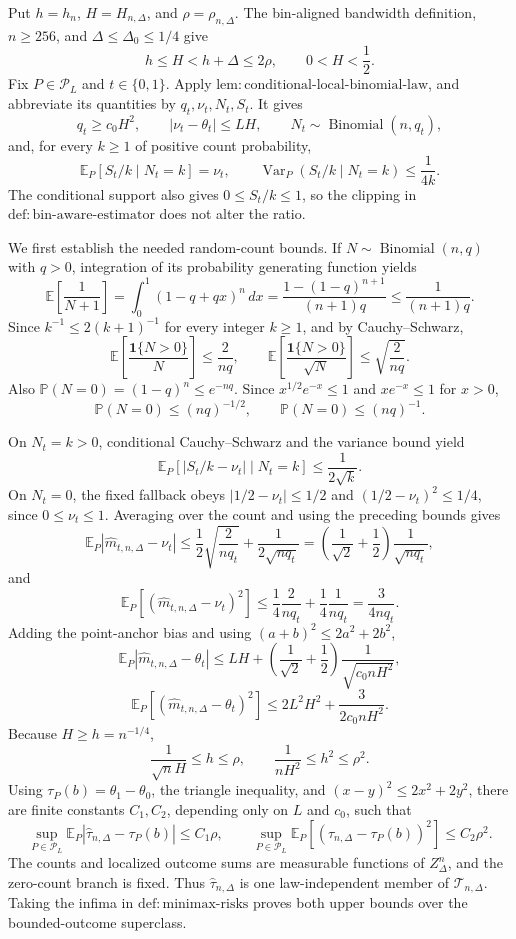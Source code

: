 Put \(h=h_n\), \(H=H_{n,\Delta}\), and \(\rho=\rho_{n,\Delta}\).  The bin-aligned bandwidth definition, \(n\geq256\), and \(\Delta\leq\Delta_0\leq1/4\) give
\[
 h\leq H<h+\Delta\leq2\rho,
 \qquad 0<H<\frac12.
\]
Fix \(P\in\mathcal P_L\) and \(t\in\{0,1\}\).  Apply \(\mathrm{lem:conditional\text{-}local\text{-}binomial\text{-}law}\), and abbreviate its quantities by \(q_t,\nu_t,N_t,S_t\).  It gives
\[
 q_t\geq c_0H^2,
 \qquad |\nu_t-\theta_t|\leq LH,
 \qquad N_t\sim\operatorname{Binomial}(n,q_t),
\]
and, for every \(k\geq1\) of positive count probability,
\[
 \mathbb E_P[S_t/k\mid N_t=k]=\nu_t,
 \qquad
 \operatorname{Var}_P(S_t/k\mid N_t=k)\leq\frac1{4k}.
\]
The conditional support also gives \(0\leq S_t/k\leq1\), so the clipping in \(\mathrm{def:bin\text{-}aware\text{-}estimator}\) does not alter the ratio.

We first establish the needed random-count bounds.  If \(N\sim\operatorname{Binomial}(n,q)\) with \(q>0\), integration of its probability generating function yields
\[
 \mathbb E\!\left[\frac1{N+1}\right]
 =\int_0^1(1-q+qx)^n\,dx
 =\frac{1-(1-q)^{n+1}}{(n+1)q}
 \leq\frac1{(n+1)q}.
\]
Since \(k^{-1}\leq2(k+1)^{-1}\) for every integer \(k\geq1\), and by Cauchy--Schwarz,
\[
 \mathbb E\!\left[\frac{\mathbf1\{N>0\}}N\right]\leq\frac2{nq},
 \qquad
 \mathbb E\!\left[\frac{\mathbf1\{N>0\}}{\sqrt N}\right]
 \leq\sqrt{\frac2{nq}}.
\]
Also \(\mathbb P(N=0)=(1-q)^n\leq e^{-nq}\).  Since \(x^{1/2}e^{-x}\leq1\) and \(xe^{-x}\leq1\) for \(x>0\),
\[
 \mathbb P(N=0)\leq(nq)^{-1/2},
 \qquad
 \mathbb P(N=0)\leq(nq)^{-1}.
\]

On \(N_t=k>0\), conditional Cauchy--Schwarz and the variance bound yield
\[
 \mathbb E_P[|S_t/k-\nu_t|\mid N_t=k]\leq\frac1{2\sqrt k}.
\]
On \(N_t=0\), the fixed fallback obeys \(|1/2-\nu_t|\leq1/2\) and \((1/2-\nu_t)^2\leq1/4\), since \(0\leq\nu_t\leq1\).  Averaging over the count and using the preceding bounds gives
\[
 \mathbb E_P|\widehat m_{t,n,\Delta}-\nu_t|
 \leq\frac12\sqrt{\frac2{nq_t}}+\frac1{2\sqrt{nq_t}}
 =\left(\frac1{\sqrt2}+\frac12\right)\frac1{\sqrt{nq_t}},
\]
and
\[
 \mathbb E_P[(\widehat m_{t,n,\Delta}-\nu_t)^2]
 \leq\frac14\frac2{nq_t}+\frac14\frac1{nq_t}
 =\frac3{4nq_t}.
\]
Adding the point-anchor bias and using \((a+b)^2\leq2a^2+2b^2\),
\[
 \mathbb E_P|\widehat m_{t,n,\Delta}-\theta_t|
 \leq LH+\left(\frac1{\sqrt2}+\frac12\right)\frac1{\sqrt{c_0nH^2}},
\]
\[
 \mathbb E_P[(\widehat m_{t,n,\Delta}-\theta_t)^2]
 \leq2L^2H^2+\frac3{2c_0nH^2}.
\]
Because \(H\geq h=n^{-1/4}\),
\[
 \frac1{\sqrt nH}\leq h\leq\rho,
 \qquad
 \frac1{nH^2}\leq h^2\leq\rho^2.
\]
Using \(\tau_P(b)=\theta_1-\theta_0\), the triangle inequality, and \((x-y)^2\leq2x^2+2y^2\), there are finite constants \(C_1,C_2\), depending only on \(L\) and \(c_0\), such that
\[
 \sup_{P\in\mathcal P_L}\mathbb E_P|\widehat\tau_{n,\Delta}-\tau_P(b)|\leq C_1\rho,
 \qquad
 \sup_{P\in\mathcal P_L}\mathbb E_P[(\widehat\tau_{n,\Delta}-\tau_P(b))^2]\leq C_2\rho^2.
\]
The counts and localized outcome sums are measurable functions of \(Z_\Delta^n\), and the zero-count branch is fixed.  Thus \(\widehat\tau_{n,\Delta}\) is one law-independent member of \(\mathcal T_{n,\Delta}\).  Taking the infima in \(\mathrm{def:minimax\text{-}risks}\) proves both upper bounds over the bounded-outcome superclass.

